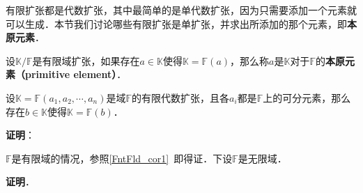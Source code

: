 


有限扩张都是代数扩张，其中最简单的是单代数扩张，因为只需要添加一个元素就可以生成．本节我们讨论哪些有限扩张是单扩张，并求出所添加的那个元素，即\textbf{本原元素}．

\begin{definition}{}\label{PrmtEl_def1}

设$\mathbb{K}/\mathbb{F}$是有限域扩张，如果存在$a\in\mathbb{K}$使得$\mathbb{K}=\mathbb{F}(a)$，那么称$a$是$\mathbb{K}$对于$\mathbb{F}$的\textbf{本原元素（primitive element）}．

\end{definition}



\begin{theorem}{}
设$\mathbb{K}=\mathbb{F}(a_1, a_2, \cdots, a_n)$是域$\mathbb{F}$的有限代数扩张，且各$a_i$都是$\mathbb{F}$上的可分元素，那么存在$b\in\mathbb{K}$使得$\mathbb{K}=\mathbb{F}(b)$．
\end{theorem}

\textbf{证明}：

$\mathbb{F}$是有限域的情况，参照\autoref{FntFld_cor1}~即得证．下设$\mathbb{F}$是无限域．



\textbf{证明}．




























